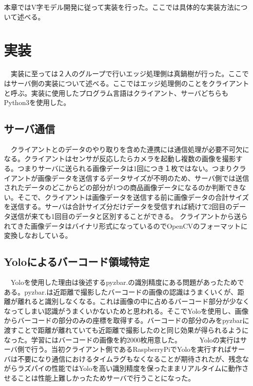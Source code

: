 本章ではV字モデル開発に従って実装を行った。ここでは具体的な実装方法について述べる。
\section{実装}
　実装に至っては２人のグループで行いエッジ処理側は真鍋樹が行った。ここではサーバ側の実装について述べる。ここではエッジ処理側のことをクライアントと呼ぶ。実装に使用したプログラム言語はクライアント、サーバどちらもPython3を使用した。

\subsection*{サーバ通信}
　クライアントとのデータのやり取りを含めた連携には通信処理が必要不可欠になる。クライアントはセンサが反応したらカメラを起動し複数の画像を撮影する。つまりサーバに送られる画像データは1回につき１枚ではない。つまりクライアントが画像データを送信するデータサイズが不明のため、サーバ側では送信されたデータのどこからどの部分が1つの商品画像データになるのか判断できない。そこで、クライアントは画像データを送信する前に画像データの合計サイズを送信する。サーバは合計サイズ分だけデータを受信すれば続けて2回目のデータ送信が来ても1回目のデータと区別することができる。
クライアントから送られてきた画像データはバイナリ形式になっているのでOpenCVのフォーマットに変換しなおしている。

\subsection*{Yoloによるバーコード領域特定}
　Yoloを使用した理由は後述するpyzbar\cite{pyzbar}.の識別精度にある問題があったためである。pyzbar\cite{pyzbar}.は近距離で撮影したバーコードの画像の認識はうまくいくが、距離が離れると識別しなくなる。これは画像の中に占めるバーコード部分が少なくなってしまい認識がうまくいかないためと思われる。そこでYoloを使用し、画像からバーコードの部分のみの座標を取得する。バーコードの部分のみをpyzbarに渡すことで距離が離れていても近距離で撮影したのと同じ効果が得られるようになった。学習にはバーコードの画像を約2000枚用意した。
　
　Yoloの実行はサーバ側で行う。当初クライアント側であるRaspberryPiでYoloを実行すればサーバは不要になり通信におけるタイムラグもなくなることが期待されたが、残念ながらラズパイの性能ではYoloを高い識別精度を保ったままリアルタイムに動作させることは性能上難しかったためサーバで行うことになった。

